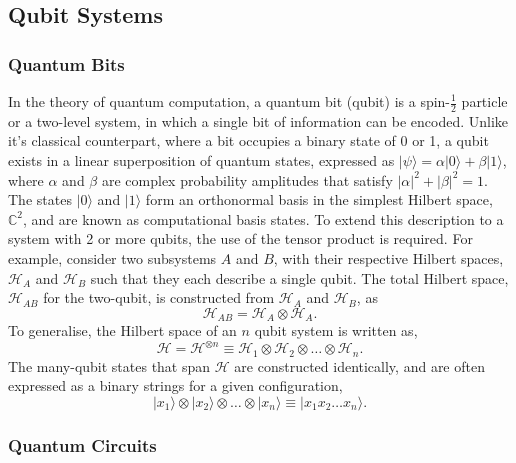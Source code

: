 

\subsection{Qubit Systems}
\subsubsection{Quantum Bits} %

In the theory of quantum computation, a quantum bit (qubit) is a spin-$\frac{1}{2}$ particle or a two-level system, in which a single bit of information can be encoded. 
Unlike it's classical counterpart, where a bit occupies a binary state of 0 or 1, a qubit exists in a linear superposition of quantum states, expressed as 
$|\psi\rangle = \alpha |0\rangle + \beta |1\rangle$, where $\alpha$ and $\beta$ are complex probability amplitudes that satisfy $|\alpha|^2 + |\beta|^2 = 1$.
The states $|0\rangle$ and $|1\rangle$ form an orthonormal basis in the simplest Hilbert space, $\mathbb{C}^2$, and are known as computational basis states. 
To extend this description to a system with 2 or more qubits, the use of the tensor product is required. For example, consider two subsystems
$A$ and $B$, with their respective Hilbert spaces, $\mathcal{H}_{A}$ and $\mathcal{H}_{B}$ such that they each describe a single qubit. 
The total Hilbert space, $\mathcal{H}_{AB}$ for the two-qubit, is constructed from $\mathcal{H}_{A}$ and $\mathcal{H}_{B}$, as
\begin{equation}
    \mathcal{H}_{AB} = \mathcal{H}_{A} \otimes \mathcal{H}_{A}.
\end{equation}
To generalise, the Hilbert space of an $n$ qubit system is written as, 
\begin{equation}\label{Hilbert Space}
    \mathcal{H} = \mathcal{H}^{\otimes n} \equiv \mathcal{H}_{1} \otimes \mathcal{H}_{2} \otimes \dots \otimes \mathcal{H}_{n}. 
\end{equation}
The many-qubit states that span $\mathcal{H}$ are constructed identically, and are often expressed as a binary strings for a given configuration, 
\begin{equation}\label{nqubit}
    |x_1\rangle \otimes |x_2\rangle \otimes \dots \otimes |x_n\rangle \equiv |x_1 x_2 \dots x_n\rangle.
\end{equation}





\subsubsection{Quantum Circuits}

